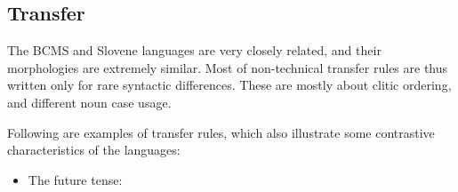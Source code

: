 \subsection{Transfer}

The BCMS and Slovene languages are very closely related, and their
morphologies are extremely similar. Most of non-technical transfer
rules are thus written only for rare syntactic differences. These are
mostly about clitic ordering, and different noun case usage.

Following are examples of transfer rules, which also illustrate some
contrastive characteristics of the languages:

\begin{itemize}
\item The future tense:
\end{itemize}
